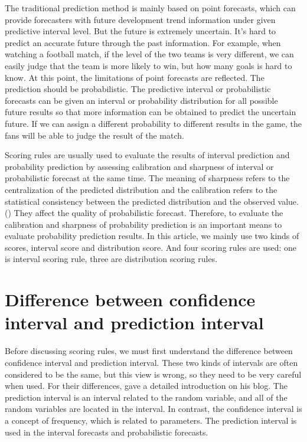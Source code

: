 \documentclass{monashthesis}
\theoremstyle{definition}
\theoremstyle{definition}
\theoremstyle{definition}
\theoremstyle{remark}
\begin{document}
The traditional prediction method is mainly based on point forecasts,
which can provide forecasters with future development trend information
under given predictive interval level. But the future is extremely
uncertain. It's hard to predict an accurate future through the past
information. For example, when watching a football match, if the level
of the two teams is very different, we can easily judge that the team is
more likely to win, but how many goals is hard to know. At this point,
the limitations of point forecasts are reflected. The prediction should
be probabilistic. The predictive interval or probabilistic forecasts can
be given an interval or probability distribution for all possible future
results so that more information can be obtained to predict the
uncertain future. If we can assign a different probability to different
results in the game, the fans will be able to judge the result of the
match.

Scoring rules are usually used to evaluate the results of interval
prediction and probability prediction by assessing calibration and
sharpness of interval or probabilistic forecast at the same time. The
meaning of sharpness refers to the centralization of the predicted
distribution and the calibration refers to the statistical consistency
between the predicted distribution and the observed value.
(\textcite{GBR07}) They affect the quality of probabilistic forecast.
Therefore, to evaluate the calibration and sharpness of probability
prediction is an important means to evaluate probability prediction
results. In this article, we mainly use two kinds of scores, interval
score and distribution score. And four scoring rules are used: one is
interval scoring rule, three are distribution scoring rules.

\section{Difference between confidence interval and prediction
interval}\label{difference-between-confidence-interval-and-prediction-interval}

Before discussing scoring rules, we must first understand the difference
between confidence interval and prediction interval. These two kinds of
intervals are often considered to be the same, but this view is wrong,
so they need to be very careful when used. For their differences,
\textcite{RH13} gave a detailed introduction on his blog. The prediction
interval is an interval related to the random variable, and all of the
random variables are located in the interval. In contrast, the
confidence interval is a concept of frequency, which is related to
parameters. The prediction interval is used in the interval forecasts
and probabilistic forecasts.
\end{document}
